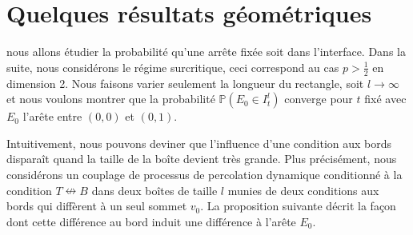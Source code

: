 \documentclass[titlepage,a4paper,12pt]{article}
\newcounter{prop}
\newcounter{cor}
\newcommand{\nconnect}{\nleftrightarrow}
\begin{document}
\section{Quelques résultats géométriques}
nous allons étudier la probabilité qu'une arrête fixée soit dans l'interface. Dans la suite, nous considérons le régime surcritique, ceci correspond au cas $p>\frac{1}{2}$ en dimension 2. Nous faisons varier seulement la longueur du rectangle, soit $l \rightarrow \infty$ et nous voulons montrer que la probabilité $\mathbb{P}(E_0 \in I^l_t)$ converge pour $t$ fixé avec $E_0$ l'arête entre $(0,0)$ et $(0,1)$.

Intuitivement, nous pouvons deviner que l'influence d'une condition aux bords disparaît quand la taille de la boîte devient très grande. Plus précisément, nous considérons un couplage de processus de percolation dynamique conditionné à la condition $T\nconnect B$ dans deux boîtes de taille $l$ munies de deux conditions aux bords qui diffèrent à un seul sommet $v_0$. La proposition suivante décrit la façon dont cette différence au bord induit une différence à l'arête $E_0$.
\end{document}
